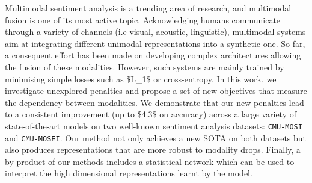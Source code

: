 Multimodal sentiment analysis is a trending area of research, and multimodal fusion is one of its most active topic. Acknowledging humans communicate through a variety of channels (i.e visual, acoustic, linguistic), multimodal systems aim at integrating different unimodal representations into a synthetic one. So far, a consequent effort has been made on developing complex architectures allowing the fusion of these modalities. However, such systems are mainly trained by minimising simple losses such as \$L\_1\$ or cross-entropy. In this work, we investigate unexplored penalties and propose a set of new objectives that measure the dependency between modalities. We demonstrate that our new penalties lead to a consistent improvement (up to \$4.3\$ on accuracy) across a large variety of state-of-the-art models on two well-known sentiment analysis datasets: \texttt{CMU-MOSI} and \texttt{CMU-MOSEI}. Our method not only achieves a new SOTA on both datasets but also produces representations that are more robust to modality drops. Finally, a by-product of our methods includes a statistical network which can be used to interpret the high dimensional representations learnt by the model.

